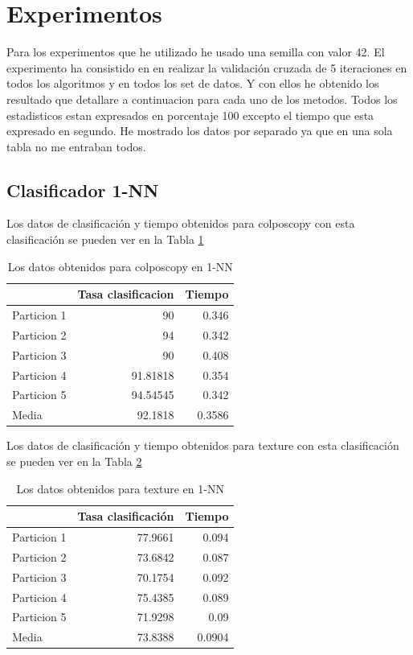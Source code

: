\documentclass[12pt,a4paper]{article}
\begin{document}
\section{Experimentos}
Para los experimentos que he utilizado he usado una semilla con valor 42. El experimento ha consistido en en realizar la validación cruzada de 5 iteraciones en todos los algoritmos y en todos los set de datos. Y con ellos he obtenido los resultado que detallare a continuacion para cada uno de los metodos. Todos los estadisticos estan expresados en porcentaje 100 excepto el tiempo que esta expresado en segundo.
He mostrado los datos por separado ya que en una sola tabla no me entraban todos.
\subsection{Clasificador 1-NN}
Los datos de clasificación y tiempo obtenidos para colposcopy con esta clasificación se pueden ver en la Tabla \ref{tab:1colposcopy}
\begin{table}[H]
	\centering
	\caption {Los datos obtenidos para colposcopy en 1-NN} \label{tab:1colposcopy} 
	
	\begin{tabular}{|l|r|r|}
		\hline
		& Tasa clasificacion & Tiempo\\
		\hline
		Particion 1 & 90 & 0.346 \\
		\hline
		Particion 2 & 94 & 0.342 \\
		\hline
		Particion 3 & 90 & 0.408\\
		\hline
		Particion 4 & 91.81818 &  0.354\\
		\hline
		Particion 5 & 94.54545 & 0.342 \\
		\hline
		Media & 92.1818 & 0.3586 \\
		\hline
	\end{tabular}
\end{table}
Los datos de clasificación y tiempo obtenidos para texture con esta clasificación se pueden ver en la Tabla \ref{tab:1texture}
\begin{table}[H]
	\centering
	\caption {Los datos obtenidos para texture en 1-NN} \label{tab:1texture} 
	
	\begin{tabular}{|l|r|r|}
		\hline
		& Tasa clasificación & Tiempo\\
		\hline
		Particion 1 & 77.9661 & 0.094 \\
		\hline
		Particion 2 & 73.6842 & 0.087 \\
		\hline
		Particion 3 & 70.1754 & 0.092\\
		\hline
		Particion 4 & 75.4385 & 0.089\\
		\hline
		Particion 5 & 71.9298 & 0.09 \\
		\hline
		Media & 73.8388 & 0.0904 \\
		\hline
	\end{tabular}
\end{table} 
\end{document}
